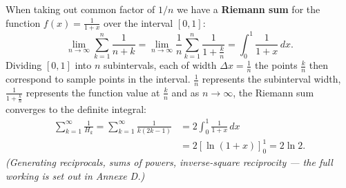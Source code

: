When taking out common factor of \(1/n\) we have a \textbf{Riemann sum} for the function \( f(x) = \frac{1}{1+x} \) over the interval \([0, 1]\):
\[
\lim_{n \to \infty} \sum_{k=1}^n \frac{1}{n+k}=\lim_{n \to \infty}\frac{1}{n} \sum_{k=1}^n \frac{1}{1 + \frac{k}{n}}=\int_0^1 \frac{1}{1+x} \, dx.
\]
 Dividing \([0, 1]\) into \( n \) subintervals, each of width \( \Delta x = \frac{1}{n} \) the points \( \frac{k}{n} \) then correspond to sample points in the interval. \( \frac{1}{n} \) represents the subinterval width, \( \frac{1}{1 + \frac{k}{n}} \) represents the function value at \( \frac{k}{n} \) and as \( n \to \infty \), the Riemann sum converges to the definite integral:
\begin{align*}
\sum_{k=1}^\infty \frac{1}{H_k} =\sum_{k=1}^\infty \frac{1}{k(2k-1)} 
&= 2 \int_0^1 \frac{1}{1+x} \, dx \\
&= 2 \left[\ln(1+x)\right]_0^1=\boxed{2\ln 2}.
\end{align*}
\textit{(Generating reciprocals, sums of powers, inverse-square reciprocity --- the full working is set out in Annexe D.)}

